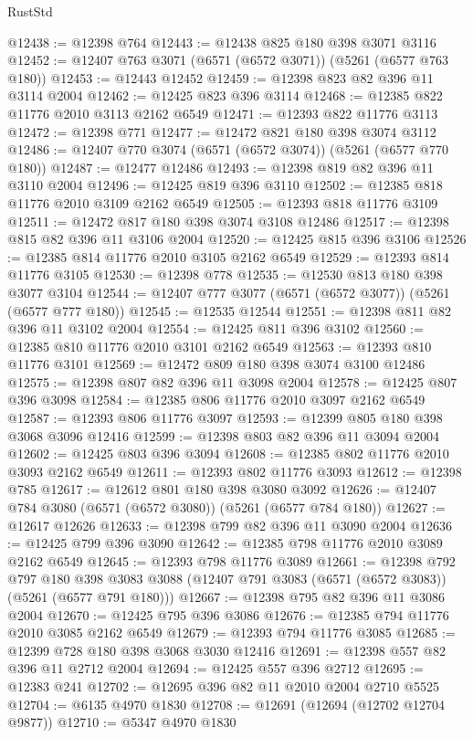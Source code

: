 \begin{lexlean}{RustStd}
\begin{coremodule}
@12438 := @12398 @764
@12443 := @12438 @825 @180 @398 @3071 @3116
@12452 := @12407 @763 @3071 (@6571 (@6572 @3071)) (@5261 (@6577 @763 @180))
@12453 := @12443 @12452
@12459 := @12398 @823 @82 @396 @11 @3114 @2004
@12462 := @12425 @823 @396 @3114
@12468 := @12385 @822 @11776 @2010 @3113 @2162 @6549
@12471 := @12393 @822 @11776 @3113
@12472 := @12398 @771
@12477 := @12472 @821 @180 @398 @3074 @3112
@12486 := @12407 @770 @3074 (@6571 (@6572 @3074)) (@5261 (@6577 @770 @180))
@12487 := @12477 @12486
@12493 := @12398 @819 @82 @396 @11 @3110 @2004
@12496 := @12425 @819 @396 @3110
@12502 := @12385 @818 @11776 @2010 @3109 @2162 @6549
@12505 := @12393 @818 @11776 @3109
@12511 := @12472 @817 @180 @398 @3074 @3108 @12486
@12517 := @12398 @815 @82 @396 @11 @3106 @2004
@12520 := @12425 @815 @396 @3106
@12526 := @12385 @814 @11776 @2010 @3105 @2162 @6549
@12529 := @12393 @814 @11776 @3105
@12530 := @12398 @778
@12535 := @12530 @813 @180 @398 @3077 @3104
@12544 := @12407 @777 @3077 (@6571 (@6572 @3077)) (@5261 (@6577 @777 @180))
@12545 := @12535 @12544
@12551 := @12398 @811 @82 @396 @11 @3102 @2004
@12554 := @12425 @811 @396 @3102
@12560 := @12385 @810 @11776 @2010 @3101 @2162 @6549
@12563 := @12393 @810 @11776 @3101
@12569 := @12472 @809 @180 @398 @3074 @3100 @12486
@12575 := @12398 @807 @82 @396 @11 @3098 @2004
@12578 := @12425 @807 @396 @3098
@12584 := @12385 @806 @11776 @2010 @3097 @2162 @6549
@12587 := @12393 @806 @11776 @3097
@12593 := @12399 @805 @180 @398 @3068 @3096 @12416
@12599 := @12398 @803 @82 @396 @11 @3094 @2004
@12602 := @12425 @803 @396 @3094
@12608 := @12385 @802 @11776 @2010 @3093 @2162 @6549
@12611 := @12393 @802 @11776 @3093
@12612 := @12398 @785
@12617 := @12612 @801 @180 @398 @3080 @3092
@12626 := @12407 @784 @3080 (@6571 (@6572 @3080)) (@5261 (@6577 @784 @180))
@12627 := @12617 @12626
@12633 := @12398 @799 @82 @396 @11 @3090 @2004
@12636 := @12425 @799 @396 @3090
@12642 := @12385 @798 @11776 @2010 @3089 @2162 @6549
@12645 := @12393 @798 @11776 @3089
@12661 := @12398
    @792
    @797
    @180
    @398
    @3083
    @3088
    (@12407 @791 @3083 (@6571 (@6572 @3083)) (@5261 (@6577 @791 @180)))
@12667 := @12398 @795 @82 @396 @11 @3086 @2004
@12670 := @12425 @795 @396 @3086
@12676 := @12385 @794 @11776 @2010 @3085 @2162 @6549
@12679 := @12393 @794 @11776 @3085
@12685 := @12399 @728 @180 @398 @3068 @3030 @12416
@12691 := @12398 @557 @82 @396 @11 @2712 @2004
@12694 := @12425 @557 @396 @2712
@12695 := @12383 @241
@12702 := @12695 @396 @82 @11 @2010 @2004 @2710 @5525
@12704 := @6135 @4970 @1830
@12708 := @12691 (@12694 (@12702 @12704 @9877))
@12710 := @5347 @4970 @1830

\end{coremodule}
\end{lexlean}

